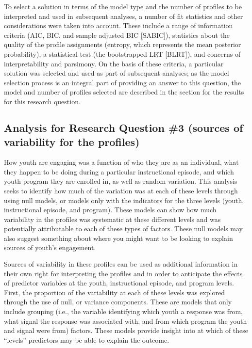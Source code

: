 \documentclass[]{msu-thesis}
\theoremstyle{definition}
\theoremstyle{definition}
\theoremstyle{definition}
\theoremstyle{remark}
\begin{document}
To select a solution in terms of the model type and the number of
profiles to be interpreted and used in subsequent analyses, a number of
fit statistics and other considerations were taken into account. These
include a range of information criteria (AIC, BIC, and sample adjusted
BIC {[}SABIC{]}), statistics about the quality of the profile
assignments (entropy, which represents the mean posterior probability),
a statistical test (the bootstrapped LRT {[}BLRT{]}), and concerns of
interpretability and parsimony. On the basis of these criteria, a
particular solution was selected and used as part of subsequent
analyses; as the model selection process is an integral part of
providing an answer to this question, the model and number of profiles
selected are described in the section for the results for this research
question.

\subsection{Analysis for Research Question \#3 (sources of variability
for the
profiles)}\label{analysis-for-research-question-3-sources-of-variability-for-the-profiles}

How youth are engaging was a function of who they are as an individual,
what they happen to be doing during a particular instructional episode,
and which youth program they are enrolled in, as well as random
variation. This analysis seeks to identify how much of the variation was
at each of these levels through using null models, or models only with
the indicators for the three levels (youth, instructional episode, and
program). These models can show how much variability in the profiles was
systematic at these different levels and was potentially attributable to
each of these types of factors. These null models may also suggest
something about where you might want to be looking to explain sources of
youth's engagement.

Sources of variability in these profiles can be used as additional
information in their own right for interpreting the profiles and in
order to anticipate the effects of predictor variables at the youth,
instructional episode, and program levels. First, the proportion of the
variability at each of these levels was explored through the use of
null, or variance components. These are models that only include
grouping (i.e., the variable identifying which youth a response was
from, what signal the response was associated with, and from which
program the youth and signal were from) factors. These models provide
insight into at which of these ``levels'' predictors may be able to
explain the outcome.
\end{document}
